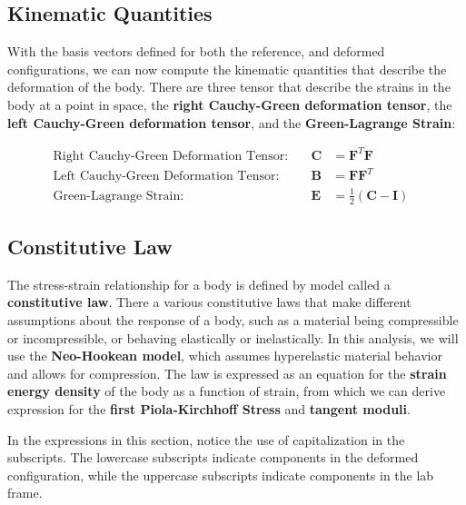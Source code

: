 \documentclass[]{spie}  %
\begin{document}
\subsection{Kinematic Quantities}
With the basis vectors defined for both the reference, and deformed configurations, we can now compute the kinematic quantities that describe the deformation of the body. There are three tensor that describe the strains in the body at a point in space, the \textbf{right Cauchy-Green deformation tensor}, the \textbf{left Cauchy-Green deformation tensor}, and the \textbf{Green-Lagrange Strain}:

\begin{align}
\textrm{Right Cauchy-Green Deformation Tensor:} & \ & \bm{C} 	&= \bm{F}^T\bm{F} & \\
\textrm{Left Cauchy-Green Deformation Tensor:}	& \ & \bm{B}	&= \bm{F}\bm{F}^T & \\
\textrm{Green-Lagrange Strain:}					& \ & \bm{E} 	&= \frac{1}{2}(\bm{C} - \bm{I}) &
\end{align}


\subsection{Constitutive Law}
\label{sec: constitutive law}
The stress-strain relationship for a body is defined by model called a \textbf{constitutive law}. There a various constitutive laws that make different assumptions about the response of a body, such as a material being compressible or incompressible, or behaving elastically or inelastically. In this analysis, we will use the \textbf{Neo-Hookean model}, which assumes hyperelastic material behavior and allows for compression. The law is expressed as an equation for the \textbf{strain energy density} of the body as a function of strain, from which we can derive expression for the \textbf{first Piola-Kirchhoff Stress} and \textbf{tangent moduli}. 

In the expressions in this section, notice the use of capitalization in the subscripts. The lowercase subscripts indicate components in the deformed configuration, while the uppercase subscripts indicate components in the lab frame. 
\end{document}
